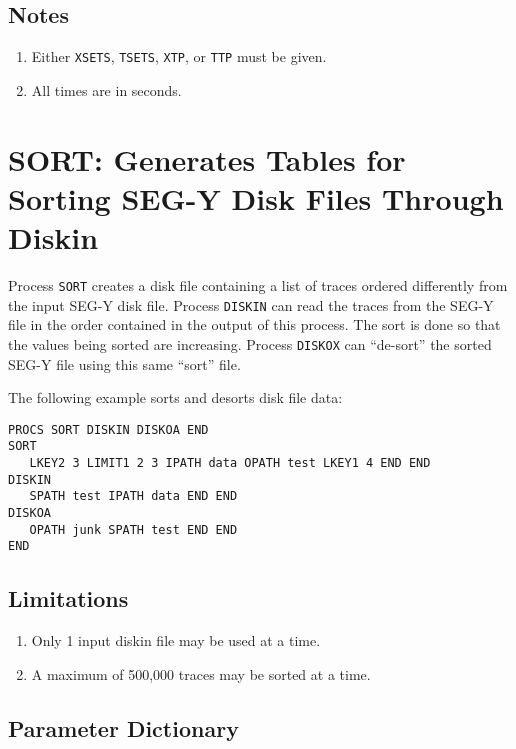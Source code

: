 \subsection{Notes}

\begin{enumerate}
    \item   Either \texttt{XSETS}, \texttt{TSETS}, \texttt{XTP}, or \texttt{TTP} must be given.
\item   All times are in seconds.
\end{enumerate}

\section{SORT: Generates Tables for Sorting SEG-Y Disk Files Through Diskin}
\label{cmd_sort}

Process \texttt{SORT} creates a disk file containing a list of traces ordered
differently from the input SEG-Y disk file.  Process \texttt{DISKIN} can read the
traces from the SEG-Y file in the order contained in the output of this
process.  The sort is done so that the values being sorted are
increasing.  Process \texttt{DISKOX} can ``de-sort'' the sorted SEG-Y file using
this same ``sort'' file.

The following example sorts and desorts disk file data:
\begin{verbatim}
PROCS SORT DISKIN DISKOA END
SORT
   LKEY2 3 LIMIT1 2 3 IPATH data OPATH test LKEY1 4 END END
DISKIN
   SPATH test IPATH data END END
DISKOA
   OPATH junk SPATH test END END
END
\end{verbatim}

\subsection{Limitations}

\begin{enumerate}
\item Only 1 input diskin file may be used at a time.
\item A maximum of 500,000 traces may be sorted at a time.
\end{enumerate}

\subsection{Parameter Dictionary}

